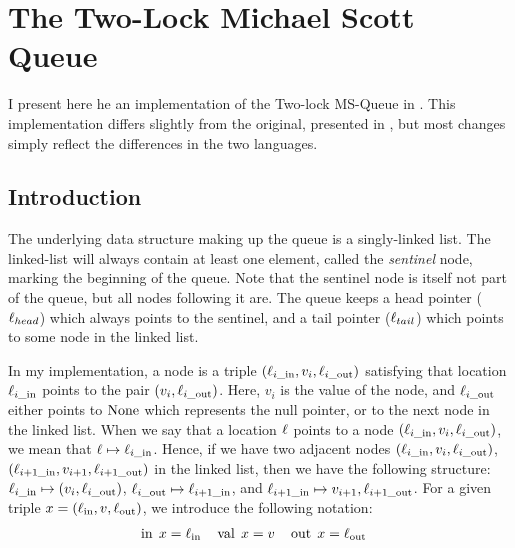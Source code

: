 \documentclass[a4paper, 11pt]{report}
\newcommand{\locin}[1]{\loc_{#1\_\text{in}}}
\newcommand{\locout}[1]{\loc_{#1\_\text{out}}}
\newcommand{\nIn}[1]{\operatorname{in} \; #1}
\newcommand{\nVal}[1]{\operatorname{val} \; #1}
\newcommand{\nOut}[1]{\operatorname{out} \; #1}
\begin{document}
\chapter{The Two-Lock Michael Scott Queue}
\label{ch:TLMSQ}

I present here he an implementation of the Two-lock MS-Queue in \heaplang. This implementation differs slightly from the original, presented in \cite{DBLP:conf/podc/MichaelS96}, but most changes simply reflect the differences in the two languages.


\section{Introduction}
\label{TLMSQ:section:introduction}

The underlying data structure making up the queue is a singly-linked list. The linked-list will always contain at least one element, called the \emph{sentinel} node, marking the beginning of the queue. Note that the sentinel node is itself not part of the queue, but all nodes following it are. The queue keeps a head pointer ($\ell_{head}$) which always points to the sentinel, and a tail pointer ($\ell_{tail}$) which points to some node in the linked list.

In my implementation, a node is a triple $(\locin{i}, v_i, \locout{i})$ satisfying that location $\locin{i}$ points to the pair $(v_i, \locout{i})$. Here, $v_i$ is the value of the node, and $\locout{i}$ either points to $\operatorname{None}$ which represents the null pointer, or to the next node in the linked list. When we say that a location $\ell$ points to a node $(\locin{i}, v_i, \locout{i})$, we mean that $\loc \mapsto \locin{i}$. Hence, if we have two adjacent nodes $(\locin{i}, v_i, \locout{i})$, $(\locin{i+1}, v_{i+1}, \locout{i+1})$ in the linked list, then we have the following structure: $\locin{i} \mapsto (v_i, \locout{i})$, $\locout{i} \mapsto \locin{i+1}$, and $\locin{i+1} \mapsto v_{i+1}, \locout{i+1}$.
For a given triple $x = (\ell_\text{in}, v, \ell_\text{out})$, we introduce the following notation:
\begin{align*}
  &\nIn{x} = \loc_\text{in}& &\nVal{x} = v& &\nOut{x} = \loc_\text{out}
\end{align*}
\end{document}
